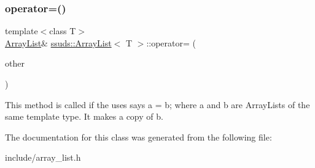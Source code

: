 \subsubsection{\texorpdfstring{operator=()}{operator=()}}
{\footnotesize\ttfamily template$<$class T$>$ \\
\mbox{\hyperlink{classssuds_1_1_array_list}{Array\+List}}\& \mbox{\hyperlink{classssuds_1_1_array_list}{ssuds\+::\+Array\+List}}$<$ T $>$\+::operator= (\begin{DoxyParamCaption}\item[{const \mbox{\hyperlink{classssuds_1_1_array_list}{Array\+List}}$<$ T $>$ \&}]{other }\end{DoxyParamCaption})\hspace{0.3cm}{\ttfamily [inline]}}

This method is called if the uses says a = b; where a and b are Array\+Lists of the same template type. It makes a copy of b. 

The documentation for this class was generated from the following file\+:\begin{DoxyCompactItemize}
\item 
include/array\+\_\+list.\+h\end{DoxyCompactItemize}
